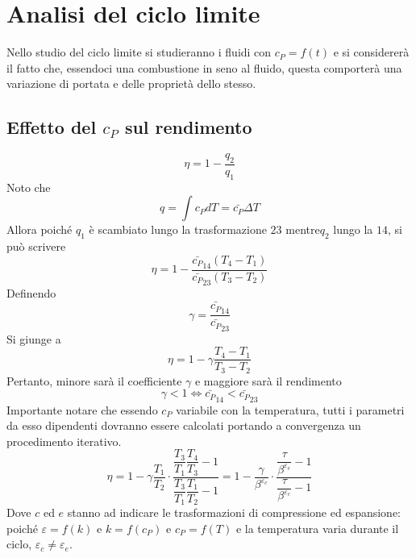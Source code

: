 \section{Analisi del ciclo limite}
\begin{adjustwidth}{2in}{}
	Nello studio del ciclo limite si studieranno i fluidi con $c_P=f(t)$ e si considererà il fatto che, essendoci una combustione in seno al fluido, questa comporterà una variazione di portata e delle proprietà dello stesso. 
\end{adjustwidth}
\subsection{Effetto del $c_P$ sul rendimento}
\begin{adjustwidth}{2in}{}
	\[\eta = 1 - \dfrac{q_2}{q_1}\]
	Noto che
	\[q = \int c_P dT = \bar{c_P}\Delta T\]
	Allora poiché $q_1$ è scambiato lungo la trasformazione $23$ mentre$q_2$ lungo la $14$, si può scrivere
	\[\eta = 1 - \dfrac{\bar{c_P}_{14}(T_4-T_1)}{\bar{c_P}_{23}(T_3-T_2)}\]
	Definendo 
	\[\gamma = \dfrac{\bar{c_P}_{14}}{\bar{c_P}_{23}}\]
	Si giunge a  
	\[\eta = 1 - \gamma\dfrac{T_4-T_1}{T_3-T_2}\]
	Pertanto, minore sarà il coefficiente $\gamma$ e maggiore sarà il rendimento 
	\[\gamma <1 \Leftrightarrow\bar{c_P}_{14}<\bar{c_P}_{23} \]
	Importante notare che essendo $c_P$ variabile con la temperatura, tutti i parametri da esso dipendenti dovranno essere calcolati portando a convergenza un procedimento iterativo.
	\[\eta = 1 - \gamma\dfrac{T_1}{T_2}\cdot\dfrac{\dfrac{T_3}{T_1}\dfrac{T_4}{T_3}-1}{\dfrac{T_3}{T_1}\dfrac{T_1}{T_2} -1} = 1 - \dfrac{\gamma}{\beta^{\varepsilon_c}}\cdot\dfrac{\dfrac{\tau}{\beta^{\varepsilon_e}}-1}{\dfrac{\tau}{\beta^{\varepsilon_c}}-1}\]
	Dove $c$ ed $e$ stanno ad indicare le trasformazioni di compressione ed espansione: 
	poiché $\varepsilon= f(k)$ e $k = f(c_P)$ e $c_P = f(T)$ e la temperatura varia durante il ciclo, $\varepsilon_c\ne\varepsilon_e$.
\end{adjustwidth}	
